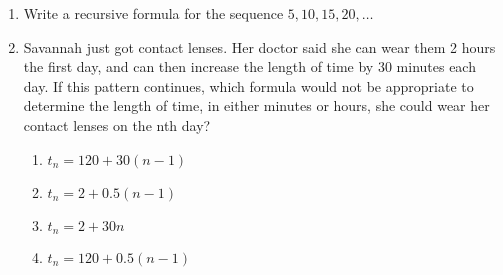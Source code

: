 \documentclass[12pt, twoside]{article}
\begin{document}
\begin{enumerate}[itemsep=0.5cm]
\item Write a recursive formula for the sequence $5, 10, 15, 20, \dots$ \vspace{3cm}


\item Savannah just got contact lenses. Her doctor said she can wear them 2 hours the first day, and can then increase the length of time by 30 minutes each day. If this pattern continues, which formula would not be appropriate to determine the length of time, in either minutes or hours, she could wear her contact lenses on the nth day?
\begin{enumerate}
    \item $t_n = 120 + 30(n-1)$
    \item $t_n = 2 + 0.5(n-1)$
    \item $t_n = 2 + 30n$
    \item $t_n = 120 + 0.5(n-1)$
\end{enumerate}


\end{enumerate}
\end{document}
